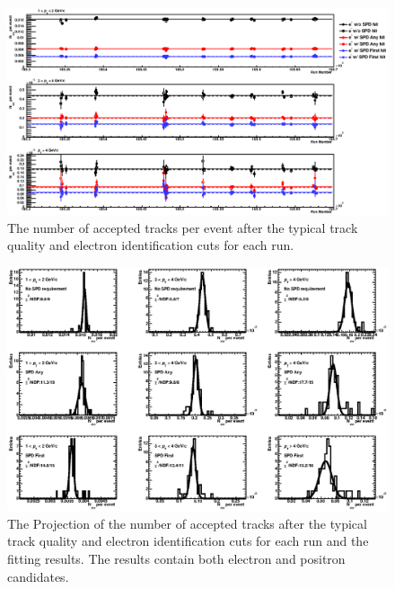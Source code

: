 \begin{figure}[!h]
  \centering
  \includegraphics[width=16cm]{chap4/figure/QA/RunbyRunQA_MB.eps}
  \caption{The number of accepted tracks per event after the typical track quality and electron identification cuts for each run.}
  \label{fig_4_runqa_MB}
\end{figure}
\begin{figure}[!h]
  \centering
  \includegraphics[width=16cm]{chap4/figure/QA/RunbyRunQAPro_MB.eps}
  \caption{The Projection of the number of accepted tracks after the typical track quality and electron identification cuts for each run and the fitting results. The results contain both electron and positron candidates. }
  \label{fig_4_runqapro_MB}
\end{figure}

